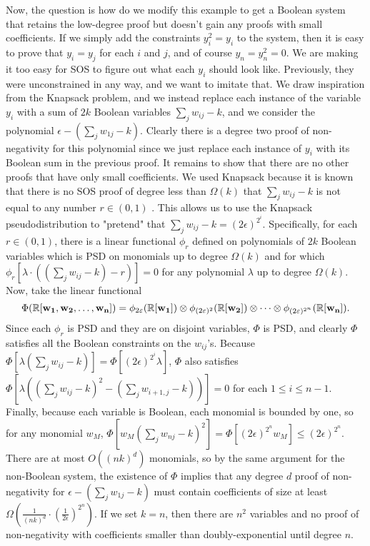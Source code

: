 Now, the question is how do we modify this example to get a Boolean system that retains the low-degree proof but doesn't gain any proofs with small coefficients. If we simply add the constraints $y_i^2 = y_i$ to the system, then it is easy to prove that $y_i = y_j$ for each $i$ and $j$, and of course $y_n = y_n^2 = 0$. We are making it too easy for SOS to figure out what each $y_i$ should look like. Previously, they were unconstrained in any way, and we want to imitate that. We draw inspiration from the Knapsack problem, and we instead replace each instance of the variable $y_i$ with a sum of $2k$ Boolean variables $\sum_j w_{ij} - k$, and we consider the polynomial $\epsilon - (\sum_j w_{1j} - k)$. Clearly there is a degree two proof of non-negativity for this polynomial since we just replace each instance of $y_i$ with its Boolean sum in the previous proof. It remains to show that there are no other proofs that have only small coefficients. We used Knapsack because it is known that there is no SOS proof of degree less than $\Omega(k)$ that $\sum_j w_{ij} - k$ is not equal to any number $r \in (0,1)$ \cite{}. This allows us to use the Knapsack pseudodistribution to "pretend" that $\sum_j w_{ij} - k = (2\epsilon)^{2^i}$. Specifically, for each $r \in (0,1)$, there is a linear functional $\phi_r$ defined on polynomials of $2k$ Boolean variables which is PSD on monomials up to degree $\Omega(k)$ and for which $\phi_r[\lambda\cdot((\sum_j w_{ij} - k) - r)] = 0$ for any polynomial $\lambda$ up to degree $\Omega(k)$. Now, take the linear functional 
\[\Phi(\mathbb R[{\bf w_1}, {\bf w_2}, \dots, {\bf w_n}]) = \phi_{2\varepsilon}(\mathbb R[{\bf w_1}]) \otimes \phi_{(2\varepsilon)^2}(\mathbb R[{\bf w_2}])\otimes \dots \otimes \phi_{(2\varepsilon)^{2^n}}(\mathbb R[{\bf w_n}]).\]
Since each $\phi_r$ is PSD and they are on disjoint variables, $\Phi$ is PSD, and clearly $\Phi$ satisfies all the Boolean constraints on the $w_{ij}$'s. Because $\Phi[\lambda(\sum_j w_{ij} - k)] = \Phi[(2\epsilon)^{2^i}\lambda]$, $\Phi$ also satisfies $\Phi[\lambda((\sum_j w_{ij}-k)^2 - (\sum_j w_{i+1,j} - k))] = 0$ for each $1 \leq i \leq n-1$. Finally, because each variable is Boolean, each monomial is bounded by one, so for any monomial $w_M$, $\Phi[w_M(\sum_j w_{nj} - k)^2] = \Phi[(2\epsilon)^{2^n} w_M] \leq (2\epsilon)^{2^n}$. There are at most $O((nk)^d)$ monomials, so by the same argument for the non-Boolean system, the existence of $\Phi$ implies that any degree $d$ proof of non-negativity for $\epsilon - (\sum_j w_{1j} - k)$ must contain coefficients of size at least $\Omega(\frac{1}{(nk)^d} \cdot \left(\frac{1}{2\epsilon}\right)^{2^n})$. If we set $k = n$, then there are $n^2$ variables and no proof of non-negativity with coefficients smaller than doubly-exponential until degree $n$. 

